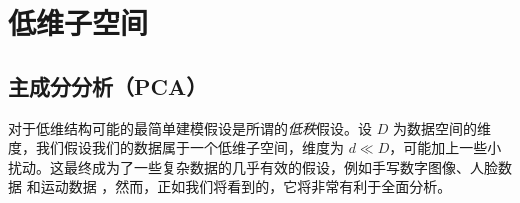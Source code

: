 \documentclass[../../book-main.tex]{subfiles}
\begin{document}






\section{低维子空间} \label{sec:lowrank}

\subsection{主成分分析（PCA）} \label{sub:pca}

对于低维结构可能的最简单建模假设是所谓的\textit{低秩}假设。设 \(D\) 为数据空间的维度，我们假设我们的数据属于一个低维子空间，维度为 \(d \ll D\)，可能加上一些小扰动。这最终成为了一些复杂数据的几乎有效的假设，例如手写数字图像、人脸数据 \cite{BasriR2003-PAMI} 和运动数据 \cite{Vidal-GPCA}，然而，正如我们将看到的，它将非常有利于全面分析。
\end{document}
